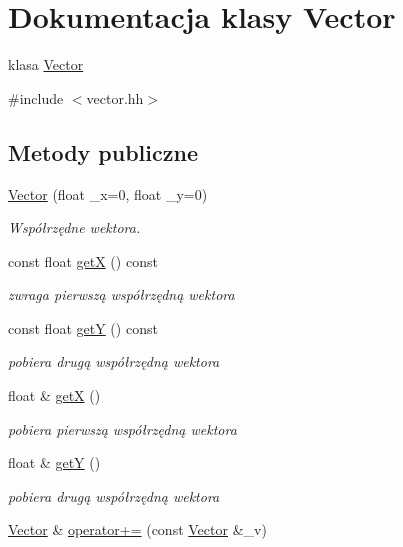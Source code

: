 \hypertarget{class_vector}{\section{Dokumentacja klasy Vector}
\label{class_vector}
}


klasa \hyperlink{class_vector}{Vector}  




{\ttfamily \#include $<$vector.\-hh$>$}

\subsection*{Metody publiczne}
\begin{DoxyCompactItemize}
\item 
\hyperlink{class_vector_af3c1b04bfbb10e29433842202365a6c4}{Vector} (float \-\_\-x=0, float \-\_\-y=0)
\begin{DoxyCompactList}\small\item\em Współrzędne wektora. \end{DoxyCompactList}\item 
const float \hyperlink{class_vector_a56cbc43a18559f85f4ce7278e98f9aad}{get\-X} () const 
\begin{DoxyCompactList}\small\item\em zwraga pierwszą współrzędną wektora \end{DoxyCompactList}\item 
const float \hyperlink{class_vector_a4ad8e8a5fb48ce193177af11340831b6}{get\-Y} () const 
\begin{DoxyCompactList}\small\item\em pobiera drugą współrzędną wektora \end{DoxyCompactList}\item 
float \& \hyperlink{class_vector_aeca06c929d4ab3078a828723a88621e6}{get\-X} ()
\begin{DoxyCompactList}\small\item\em pobiera pierwszą współrzędną wektora \end{DoxyCompactList}\item 
float \& \hyperlink{class_vector_ab0cc77ce300a60de0ab734555886ad5d}{get\-Y} ()
\begin{DoxyCompactList}\small\item\em pobiera drugą współrzędną wektora \end{DoxyCompactList}\item 
\hyperlink{class_vector}{Vector} \& \hyperlink{class_vector_a4eeab5be24ee846de3012e67a4e34820}{operator+=} (const \hyperlink{class_vector}{Vector} \&\-\_\-v)

\end{DoxyCompactItemize}
